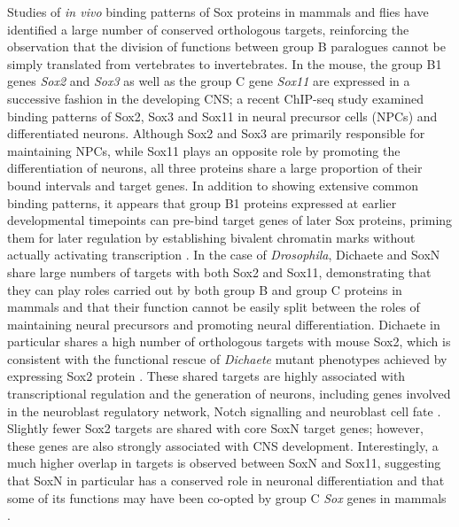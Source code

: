 Studies of \emph{in vivo} binding patterns of Sox proteins in mammals and flies have identified a large number of conserved orthologous targets, reinforcing the observation that the division of functions between group B paralogues cannot be simply translated from vertebrates to invertebrates. In the mouse, the group B1 genes \emph{Sox2} and \emph{Sox3} as well as the group C gene \emph{Sox11} are expressed in a successive fashion in the developing CNS; a recent ChIP-seq study examined binding patterns of Sox2, Sox3 and Sox11 in neural precursor cells (NPCs) and differentiated neurons. Although Sox2 and Sox3 are primarily responsible for maintaining NPCs, while Sox11 plays an opposite role by promoting the differentiation of neurons, all three proteins share a large proportion of their bound intervals and target genes. In addition to showing extensive common binding patterns, it appears that group B1 proteins expressed at earlier developmental timepoints can pre-bind target genes of later Sox proteins, priming them for later regulation by establishing bivalent chromatin marks without actually activating transcription \citep{bergsland_sequentially_2011}. In the case of \emph{Drosophila}, Dichaete and SoxN share large numbers of targets with both Sox2 and Sox11, demonstrating that they can play roles carried out by both group B and group C proteins in mammals and that their function cannot be easily split between the roles of maintaining neural precursors and promoting neural differentiation. Dichaete in particular shares a high number of orthologous targets with mouse Sox2, which is consistent with the functional rescue of \emph{Dichaete} mutant phenotypes achieved by expressing Sox2 protein \citep{soriano_drosophila_1998}. These shared targets are highly associated with transcriptional regulation and the generation of neurons, including genes involved in the neuroblast regulatory network, Notch signalling and neuroblast cell fate \citep{aleksic_role_2013}. Slightly fewer Sox2 targets are shared with core SoxN target genes; however, these genes are also strongly associated with CNS development. Interestingly, a much higher overlap in targets is observed between SoxN and Sox11, suggesting that SoxN in particular has a conserved role in neuronal differentiation and that some of its functions may have been co-opted by group C \emph{Sox} genes in mammals \citep{ferrero_soxneuro_2014}.


